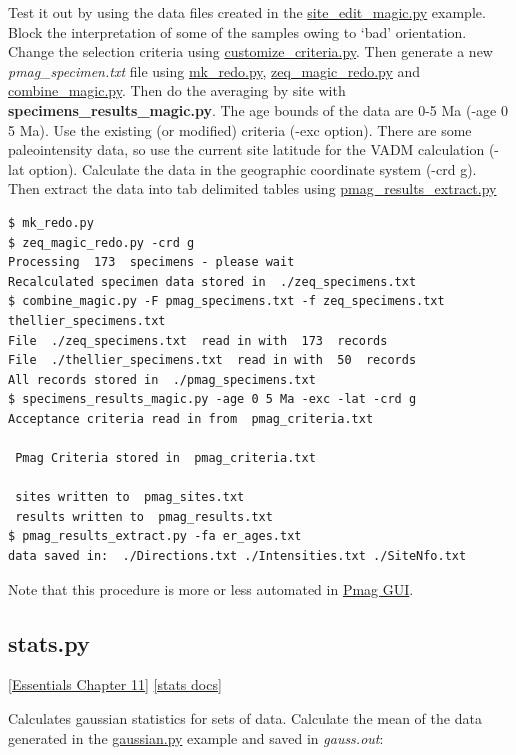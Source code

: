 \documentclass[11pt]{book}
\begin{document}
{{{Test it out  by using the data files created in the \href{#site_edit_magic.py}{site\_edit\_magic.py} example.  Block the interpretation of some of the samples owing to `bad' orientation.  Change the selection criteria using \href{customize_criteria.py}{customize\_criteria.py}.    Then generate a new {\it pmag\_specimen.txt} file using \href{#mk_redo.py}{mk\_redo.py},  \href{#zeq_magic_redo.py}{zeq\_magic\_redo.py} and \href{#combine_magic.py}{combine\_magic.py}.   Then do the averaging by site with {\bf specimens\_results\_magic.py}.  The age bounds of the data are 0-5 Ma (-age 0 5 Ma).  Use the existing (or modified) criteria (-exc option).   There are some paleointensity data, so use the current site latitude for the VADM  calculation (-lat option).   Calculate the data in the geographic coordinate system (-crd g).    Then extract the data into tab delimited tables using \href{#pmag_results_extract.py}{pmag\_results\_extract.py}

\begin{verbatim}
$ mk_redo.py
$ zeq_magic_redo.py -crd g
Processing  173  specimens - please wait
Recalculated specimen data stored in  ./zeq_specimens.txt
$ combine_magic.py -F pmag_specimens.txt -f zeq_specimens.txt thellier_specimens.txt
File  ./zeq_specimens.txt  read in with  173  records
File  ./thellier_specimens.txt  read in with  50  records
All records stored in  ./pmag_specimens.txt
$ specimens_results_magic.py -age 0 5 Ma -exc -lat -crd g
Acceptance criteria read in from  pmag_criteria.txt

 Pmag Criteria stored in  pmag_criteria.txt

 sites written to  pmag_sites.txt
 results written to  pmag_results.txt
$ pmag_results_extract.py -fa er_ages.txt
data saved in:  ./Directions.txt ./Intensities.txt ./SiteNfo.txt
\end{verbatim}

Note that this procedure is more or less automated in \href{#pmag_gui.py}{Pmag GUI}.



\subsection{stats.py}
\href{http://earthref.org/MAGIC/books/Tauxe/Essentials/WebBook3ch11.html#ch11}{[Essentials Chapter 11]}
\href{https://github.com/PmagPy/PmagPy/blob/master/programs/stats.py}{[stats docs]}

Calculates gaussian statistics for sets of data.
Calculate the mean of the data generated in the \href{#gaussian.py}{gaussian.py} example and saved in {\it gauss.out}:

}}}
\end{document}

